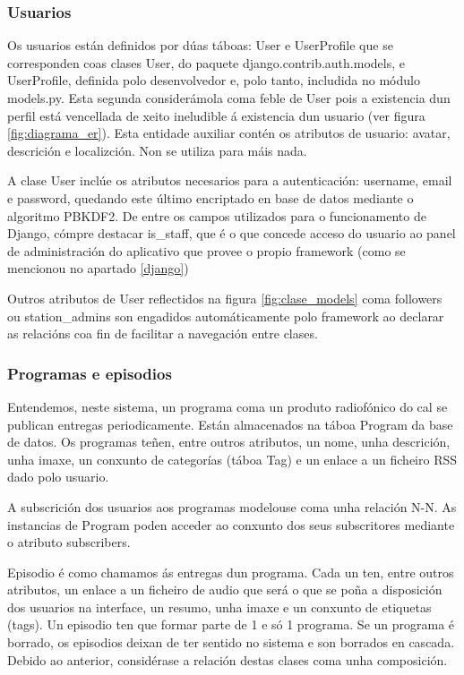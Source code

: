 \subsubsection{Usuarios}

Os usuarios están definidos por dúas táboas: User e UserProfile que se corresponden coas clases User, do paquete django.contrib.auth.models, e UserProfile, definida polo desenvolvedor e, polo tanto, includida no módulo models.py. Esta segunda considerámola coma feble de User pois a existencia dun perfil está vencellada de xeito ineludible á existencia dun usuario (ver figura \ref{fig:diagrama_er}). Esta entidade auxiliar contén os atributos de usuario: avatar, descrición e localizción. Non se utiliza para máis nada.

A clase User inclúe os atributos necesarios para a autenticación: username, email e password, quedando este último encriptado en base de datos mediante o algoritmo PBKDF2. De entre os campos utilizados para o funcionamento de Django, cómpre destacar is\_staff, que é o que concede acceso do usuario ao panel de administración do aplicativo que provee o propio framework (como se mencionou no apartado \ref{django})

Outros atributos de User reflectidos na figura \ref{fig:clase_models} coma followers ou station\_admins son engadidos automáticamente polo framework ao declarar as relacións coa fin de facilitar a navegación entre clases.


\subsubsection{Programas e episodios}

Entendemos, neste sistema, un programa coma un produto radiofónico do cal se publican entregas periodicamente. Están almacenados na táboa Program da base de datos. Os programas teñen, entre outros atributos, un nome, unha descrición, unha imaxe, un conxunto de categorías (táboa Tag) e un enlace a un ficheiro RSS dado polo usuario.

A subscrición dos usuarios aos programas modelouse coma unha relación N-N. As instancias de Program poden acceder ao conxunto dos seus subscritores mediante o atributo subscribers.

Episodio é como chamamos ás entregas dun programa. Cada un ten, entre outros atributos, un enlace a un ficheiro de audio que será o que se poña a disposición dos usuarios na interface, un resumo, unha imaxe e un conxunto de etiquetas (tags). Un episodio ten que formar parte de 1 e só 1 programa. Se un programa é borrado, os episodios deixan de ter sentido no sistema e son borrados en cascada. Debido ao anterior, considérase a relación destas clases coma unha composición.


